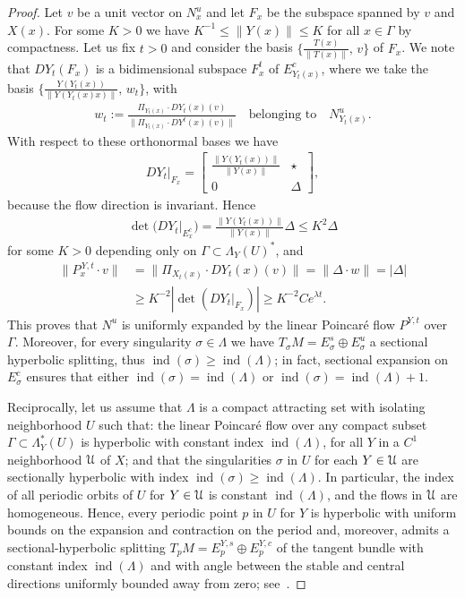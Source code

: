 \documentclass[12pt,reqno]{amsart}
\numberwithin{equation}{section}
\theoremstyle{plain}
\theoremstyle{definition}
\newcommand{\indi}{\operatorname{ind}}
\newcommand{\U}{\EuScript{U}}
\begin{document}
\begin{proof}
  Let $v$ be a unit vector on $N^u_x$ and let $F_x$ be the
  subspace spanned by $v$ and $X(x)$.  For
  some $K>0$ we have $K^{-1}\le\|Y(x)\|\le K$ for all $x\in\Gamma$
  by compactness. Let us fix $t>0$ and consider the basis
  $\{\frac{T(x)}{\|T(x)\|},\, v\}$ of $F_x$.  We note that
  $DY_t(F_x)$ is a bidimensional subspace $F^t_x$ of
  $E^c_{Y_t(x)}$, where we take the basis
  $\{\frac{Y(Y_t(x))}{\|Y(Y_t(x)x)\|},\, w_t\}$, with
  \begin{align*}
    w_t:=\frac{\Pi_{Y_t(x)}\cdot DY_t(x)(
      v)}{\|\Pi_{Y_t(x)}\cdot DY^t(x)(v)\|}
    \quad\text{belonging to}\quad N^u_{Y_t(x)}.
  \end{align*}
  With respect to these orthonormal bases we have
  \begin{align*}
    DY_t\vert_{F_x} = \left[\begin{array}{cc}
        \frac{\|Y(Y_t(x))\|}{\|Y(x)\|} & \star  \\
        0 & \Delta
      \end{array} \right],
  \end{align*}
  because the flow direction is invariant.
  Hence
  \begin{align*}
    \det\big(DY_{t}\vert_{E^{c}_{x}} \big) =
    \frac{\|Y(Y_t(x))\|}{\|Y(x)\|} \Delta
    \le K^2 \Delta
  \end{align*}
  for some $K>0$ depending only on
  $\Gamma\subset\Lambda_Y(U)^*$, and
  \begin{align*}
    \|P^{\,Y,t}_x\cdot v\| & = \| \Pi_{X_t(x)}\cdot
    DY_{t}(x)(v) \| = \|\Delta \cdot w \| = |\Delta|
    \\
    & \ge K^{-2} |\det(DY_{t}\vert_{F_x}) | \ge K^{-2} C
    e^{\lambda t}.
  \end{align*}
  This proves that $N^u$ is uniformly expanded by the linear
  Poincar\'e flow $P^{Y,t}$ over $\Gamma$. Moreover, for
  every singularity $\sigma\in\Lambda$ we have $T_\sigma
  M=E^s_\sigma\oplus E^u_\sigma$ a sectional hyperbolic
  splitting, thus $\indi(\sigma)\ge\indi(\Lambda)$; in fact,
  sectional expansion on $E^c_\sigma$ ensures that either
  $\indi(\sigma)=\indi(\Lambda)$ or
  $\indi(\sigma)=\indi(\Lambda)+1$.

  Reciprocally, let us assume that $\Lambda$ is a
  compact attracting set with isolating neighborhood
  $U$ such that: the linear Poincar\'e flow over any
  compact subset $\Gamma\subset\Lambda^*_Y(U)$ is
  hyperbolic with constant index $\indi(\Lambda)$, for
  all $Y$ in a $C^1$ neighborhood $\U$ of $X$; and that
  the singularities $\sigma$ in $U$ for each $Y\in\U$
  are sectionally hyperbolic with index
  $\indi(\sigma)\ge\indi(\Lambda)$.  In particular, the
  index of all periodic orbits of $U$ for $Y\in\U$ is
  constant $\indi(\Lambda)$, and the flows in $\U$ are
  homogeneous. Hence, every periodic point $p$ in $U$
  for $Y$ is hyperbolic with uniform bounds on the
  expansion and contraction on the period and,
  moreover, admits a sectional-hyperbolic splitting
  $T_pM = {E}_p^{Y,s} \oplus E^{Y,c}_p$ of the
  tangent bundle with constant index $\indi(\Lambda)$
  and with angle between the stable and central
  directions uniformly bounded away from zero;
  see~\cite[Section 5.4.1]{AraPac2010}.


\end{proof}
\end{document}
